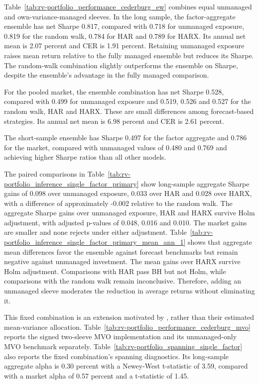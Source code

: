 \documentclass[preprint,12pt,authoryear]{elsarticle}
\begin{document}
Table~\ref{tab:rv-portfolio_performance_cederburg_ew} combines equal unmanaged and own-variance-managed sleeves. In the long sample, the factor-aggregate ensemble has net Sharpe 0.817, compared with 0.718 for unmanaged exposure, 0.819 for the random walk, 0.784 for HAR and 0.789 for HARX. Its annual net mean is 2.07 percent and CER is 1.91 percent. Retaining unmanaged exposure raises mean return relative to the fully managed ensemble but reduces its Sharpe. The random-walk combination slightly outperforms the ensemble on Sharpe, despite the ensemble's advantage in the fully managed comparison.

For the pooled market, the ensemble combination has net Sharpe 0.528, compared with 0.499 for unmanaged exposure and 0.519, 0.526 and 0.527 for the random walk, HAR and HARX. These are small differences among forecast-based strategies. Its annual net mean is 6.98 percent and CER is 2.61 percent.

 The short-sample ensemble has Sharpe 0.497 for the factor aggregate and 0.786 for the market, compared with unmanaged values of 0.480 and 0.769 and achieving higher Sharpe ratios than all other models. 
 
 
The paired comparisons in Table~\ref{tab:rv-portfolio_inference_single_factor_primary} show long-sample aggregate Sharpe gains of 0.098 over unmanaged exposure, 0.033 over HAR and 0.028 over HARX, with a difference of approximately -0.002 relative to the random walk. The aggregate Sharpe gains over unmanaged exposure, HAR and HARX survive Holm adjustment, with adjusted p-values of 0.048, 0.016 and 0.010. The market gains are smaller and none rejects under either adjustment. Table~\ref{tab:rv-portfolio_inference_single_factor_primary_mean_ann_1} shows that aggregate mean differences favor the ensemble against forecast benchmarks but remain negative against unmanaged investment. The mean gains over HARX survive Holm adjustment. Comparisons with HAR pass BH but not Holm, while comparisons with the random walk remain inconclusive. Therefore, adding an unmanaged sleeve moderates the reduction in average returns without eliminating it.

This fixed combination is an extension motivated by \citet{cederburg2020}, rather than their estimated mean-variance allocation. Table~\ref{tab:rv-portfolio_performance_cederburg_mvo} reports the signed two-sleeve MVO implementation and its unmanaged-only MVO benchmark separately. Table~\ref{tab:rv-portfolio_spanning_single_factor} also reports the fixed combination's spanning diagnostics. Its long-sample aggregate alpha is 0.30 percent with a Newey-West t-statistic of 3.59, compared with a market alpha of 0.57 percent and a t-statistic of 1.45. 
\end{document}
